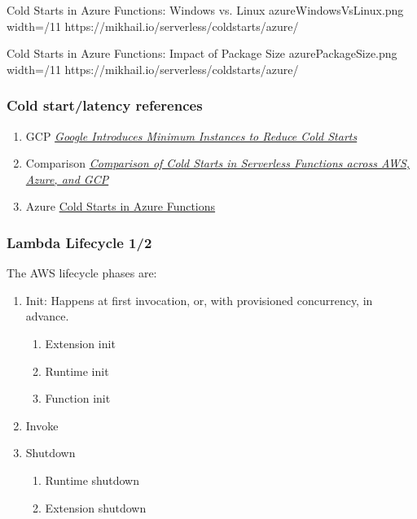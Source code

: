 \documentclass[11pt,aspectratio=169]{beamer}
\begin{document}
  \nrcanGraphicFrame
  {Cold Starts in Azure Functions: Windows vs. Linux}
  {azureWindowsVsLinux.png}
  {width=/11}
  {https://mikhail.io/serverless/coldstarts/azure/}

  \nrcanGraphicFrame
  {Cold Starts in Azure Functions: Impact of Package Size}
  {azurePackageSize.png}
  {width=/11}
  {https://mikhail.io/serverless/coldstarts/azure/}


\begin{nrcanFrame}
  \frametitle{Cold start/latency references}
  \begin{enumerate}
  \item GCP \textit{\href{https://www.infoq.com/news/2021/09/cloud-functions-min-instances/}{Google Introduces Minimum Instances to Reduce Cold Starts}}
  \item Comparison \textit{\href{https://mikhail.io/serverless/coldstarts/big3/}{Comparison of Cold Starts in Serverless Functions across AWS, Azure, and GCP}}
  \item Azure \href{https://mikhail.io/serverless/coldstarts/azure/}{Cold Starts in Azure Functions}
  \end{enumerate}

\end{nrcanFrame}


\begin{nrcanFrame}
  \frametitle{Lambda Lifecycle 1/2}
  The AWS lifecycle phases are:
  \begin{enumerate}
  \item Init: Happens at first invocation, or, with provisioned
    concurrency, in advance.
    \begin{enumerate}
    \item Extension init
    \item Runtime init
    \item Function init
    \end{enumerate}
  \item Invoke
  \item Shutdown 
    \begin{enumerate}
    \item Runtime shutdown
    \item Extension shutdown
    \end{enumerate}
  \end{enumerate}
\end{nrcanFrame}
\end{document}
